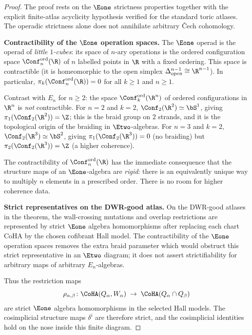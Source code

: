 \begin{proof}
The proof rests on the $\Eone$ strictness properties together with the explicit finite-atlas acyclicity hypothesis verified for the standard toric atlases. The operadic strictness alone does not annihilate arbitrary \v{C}ech cohomology.

\medskip
\noindent\textbf{Contractibility of the $\Eone$ operation spaces.} The $\Eone$ operad is the operad of \emph{little $1$-cubes}: its space of $n$-ary operations is the ordered configuration space $\Conf_n^{\mathrm{ord}}(\R)$ of $n$ labelled points in $\R$ with a fixed ordering. This space is contractible (it is homeomorphic to the open simplex $\Delta^{n-1}_{\mathrm{open}} \cong \R^{n-1}$). In particular, $\pi_k(\Conf_n^{\mathrm{ord}}(\R)) = 0$ for all $k \geq 1$ and $n \geq 1$.

Contrast with $E_n$ for $n \geq 2$: the space $\Conf_k^{\mathrm{ord}}(\R^n)$ of ordered configurations in $\R^n$ is \emph{not} contractible. For $n = 2$ and $k = 2$, $\Conf_2(\R^2) \simeq \bS^1$, giving $\pi_1(\Conf_2(\R^2)) = \Z$; this is the braid group on $2$ strands, and it is the topological origin of the braiding in $\Etwo$-algebras. For $n = 3$ and $k = 2$, $\Conf_2(\R^3) \simeq \bS^2$, giving $\pi_1(\Conf_2(\R^3)) = 0$ (no braiding) but $\pi_2(\Conf_2(\R^3)) = \Z$ (a higher coherence).

The contractibility of $\Conf_n^{\mathrm{ord}}(\R)$ has the immediate consequence that the structure maps of an $\Eone$-algebra are \emph{rigid}: there is an equivalently unique way to multiply $n$ elements in a prescribed order. There is no room for higher coherence data.

\medskip
\noindent\textbf{Strict representatives on the DWR-good atlas.} On the DWR-good atlases in the theorem, the wall-crossing mutations and overlap restrictions are represented by strict $\Eone$ algebra homomorphisms after replacing each chart CoHA by the chosen cofibrant Hall model. The contractibility of the $\Eone$ operation spaces removes the extra braid parameter which would obstruct this strict representative in an $\Etwo$ diagram; it does not assert strictifiability for arbitrary maps of arbitrary $E_n$-algebras.

Thus the restriction maps
\[
 \rho_{\alpha, \beta} \colon \CoHA(Q_\alpha, W_\alpha) \;\to\; \CoHA(Q_\alpha \cap Q_\beta)
\]
are strict $\Eone$ algebra homomorphisms in the selected Hall models. The cosimplicial structure maps $\delta^i$ are therefore strict, and the cosimplicial identities hold on the nose inside this finite diagram.


\end{proof}
